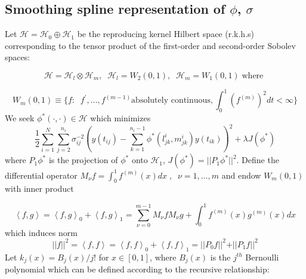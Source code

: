 \documentclass[12pt]{article}
\theoremstyle{definition}
\begin{document}
\subsection{Smoothing spline representation of $\phi$, $\sigma$}

Let $\mathcal{H} = \mathcal{H}_{0} \oplus \mathcal{H}_{1}$ be the reproducing kernel Hilbert space (r.k.h.s) corresponding to the tensor product of the first-order and second-order Sobolev spaces:

\[
\mathcal{H} = \mathcal{H}_{l} \otimes \mathcal{H}_{m}, \;\; \mathcal{H}_{l} = W_2\left(0,1\right),\;\;\mathcal{H}_{m} = W_1\left(0,1\right)\;\mbox{where }
\]

\[W_m\left(0,1\right) \equiv \lbrace f: \;\;f^\prime, \dots, f^{\left( m-1 \right)} \mbox{absolutely continuous}, \int_0^1 \left(f^{\left( m \right)}\right)^2 dt < \infty \rbrace\]
\noindent
We seek $\phi^*\left(\cdot, \cdot \right) \in \mathcal{H}$ which minimizes
\begin{equation}
\frac{1}{2}\sum_{i=1}^N \sum_{j=2}^{n_i} {\sigma^{-2}_{ij}}\left( y\left(t_{ij}\right) - \sum_{k=1}^{n_i - 1}\phi^*\left(l^i_{jk},m^i_{jk} \right)y\left(t_{ik}\right) \right)^2 + \lambda J\left(\phi^*\right)  
\label{eq:objectivefun}
\end{equation}
\noindent
where $P_1 \phi^*$ is the projection of $\phi^*$ onto $\mathcal{H}_1$, $J\left(\phi^*\right) = \vert \vert P_1 \phi^* \vert \vert^2$. Define the differential operator $M_\nu f = \int_0^1 f^{\left( m \right)}\left(x\right) dx\;,\;\; \nu = 1, \dots, m$ and endow $W_m\left(0,1\right)$ with inner product

\begin{equation}
\left< f,g\right> = \left< f,g\right>_0 + \left< f,g\right>_1 = \sum_{\nu=0}^{m-1} M_\nu f M_\nu g + \int_0^1 f^{\left( m \right)}\left(x\right)g^{\left( m \right)}\left(x\right)dx
\end{equation}
\noindent
which induces norm 
\[
\vert \vert f \vert \vert^2 = \left< f,f\right> = \left< f,f\right>_0 + \left< f,f\right>_1 = \vert \vert P_0 f \vert \vert^2 + \vert \vert P_1 f \vert \vert^2
\]
\noindent
Let $k_j\left(x\right) = B_j\left(x\right)/{j!}$ for $x \in \left[0,1\right]$, where $B_j\left(x\right)$ is the $j^{th}$ Bernoulli polynomial which can be defined according to the recursive relationship:
\end{document}
